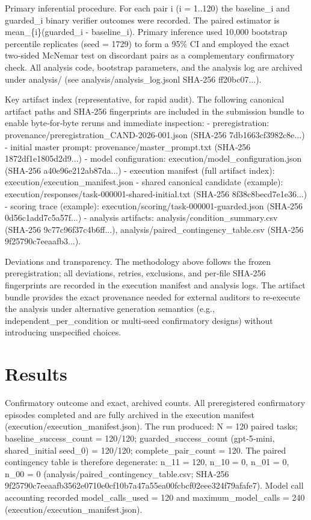 \documentclass[conference]{IEEEtran}
\begin{document}
Primary inferential procedure. For each pair i (i = 1..120) the baseline\_i and guarded\_i binary verifier outcomes were recorded. The paired estimator is mean\_\{i\}(guarded\_i - baseline\_i). Primary inference used 10,000 bootstrap percentile replicates (seed = 1729) to form a 95\% CI and employed the exact two‑sided McNemar test on discordant pairs as a complementary confirmatory check. All analysis code, bootstrap parameters, and the analysis log are archived under analysis/ (see analysis/analysis\_log.jsonl SHA‑256 ff20bc07...).

Key artifact index (representative, for rapid audit). The following canonical artifact paths and SHA‑256 fingerprints are included in the submission bundle to enable byte‑for‑byte reruns and immediate inspection:
- preregistration: provenance/preregistration\_CAND-2026-001.json (SHA‑256 7db1663cf3982c8e...)
- initial master prompt: provenance/master\_prompt.txt (SHA‑256 1872df1e1805d2d9...)
- model configuration: execution/model\_configuration.json (SHA‑256 a40e96e212ab87da...)
- execution manifest (full artifact index): execution/execution\_manifest.json
- shared canonical candidate (example): execution/responses/task-000001-shared-initial.txt (SHA‑256 8f38c8becd7e1e36...)
- scoring trace (example): execution/scoring/task-000001-guarded.json (SHA‑256 0d56c1add7c5a57f...)
- analysis artifacts: analysis/condition\_summary.csv (SHA‑256 9c77c96f37c4b6ff...), analysis/paired\_contingency\_table.csv (SHA‑256 9f25790c7eeaafb3...).

Deviations and transparency. The methodology above follows the frozen preregistration; all deviations, retries, exclusions, and per‑file SHA‑256 fingerprints are recorded in the execution manifest and analysis logs. The artifact bundle provides the exact provenance needed for external auditors to re‑execute the analysis under alternative generation semantics (e.g., independent\_per\_condition or multi‑seed confirmatory designs) without introducing unspecified choices.

\section{Results}
Confirmatory outcome and exact, archived counts. All preregistered confirmatory episodes completed and are fully archived in the execution manifest (execution/execution\_manifest.json). The run produced: N = 120 paired tasks; baseline\_success\_count = 120/120; guarded\_success\_count (gpt‑5‑mini, shared\_initial seed\_0) = 120/120; complete\_pair\_count = 120. The paired contingency table is therefore degenerate: n\_11 = 120, n\_10 = 0, n\_01 = 0, n\_00 = 0 (analysis/paired\_contingency\_table.csv; SHA‑256 9f25790c7eeaafb3562e0710e0cf10b7a47a55ea00fcbcf02eee324f79afafe7). Model call accounting recorded model\_calls\_used = 120 and maximum\_model\_calls = 240 (execution/execution\_manifest.json).
\end{document}

